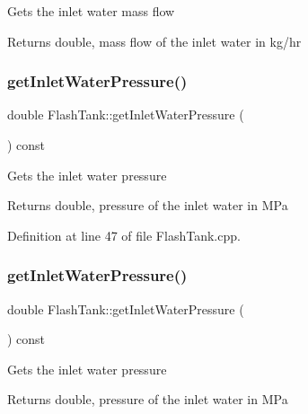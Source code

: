 Gets the inlet water mass flow \begin{DoxyReturn}{Returns}
double, mass flow of the inlet water in kg/hr 
\end{DoxyReturn}
\mbox{\label{class_flash_tank_a62e8ff97d91da0845526c494022e41da}} 
\subsubsection{\texorpdfstring{get\+Inlet\+Water\+Pressure()}{getInletWaterPressure()}\hspace{0.1cm}{\footnotesize\ttfamily [1/3]}}
{\footnotesize\ttfamily double Flash\+Tank\+::get\+Inlet\+Water\+Pressure (\begin{DoxyParamCaption}{ }\end{DoxyParamCaption}) const}

Gets the inlet water pressure \begin{DoxyReturn}{Returns}
double, pressure of the inlet water in M\+Pa 
\end{DoxyReturn}


Definition at line 47 of file Flash\+Tank.\+cpp.

\mbox{\label{class_flash_tank_a62e8ff97d91da0845526c494022e41da}} 
\subsubsection{\texorpdfstring{get\+Inlet\+Water\+Pressure()}{getInletWaterPressure()}\hspace{0.1cm}{\footnotesize\ttfamily [2/3]}}
{\footnotesize\ttfamily double Flash\+Tank\+::get\+Inlet\+Water\+Pressure (\begin{DoxyParamCaption}{ }\end{DoxyParamCaption}) const}

Gets the inlet water pressure \begin{DoxyReturn}{Returns}
double, pressure of the inlet water in M\+Pa 
\end{DoxyReturn}
\mbox{\label{class_flash_tank_a62e8ff97d91da0845526c494022e41da}} 
